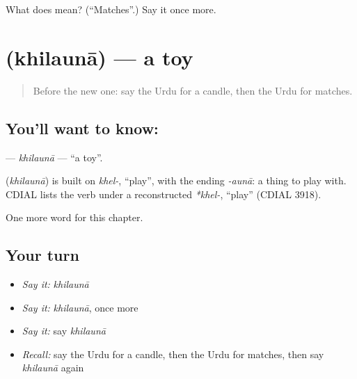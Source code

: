 \begin{tcolorbox}[breakable,colback=teal!4,colframe=teal!35!black,title={Before you move on}]
What does  mean? (\textquotedblleft{}Matches\textquotedblright{}.) Say it once more.
\end{tcolorbox}
\section[\texorpdfstring{\ur{کھلونا} (khilaunā)}{کھلونا (khilaunā)}]{ (khilaunā) — a toy}

\label{lesson:UR-C112-khilauna}



\begin{quote}
Before the new one: say the Urdu for a candle, then the Urdu for matches.
\end{quote}

\subsection*{You'll want to know: }
\textbf{} — \emph{khilaunā} — \textquotedblleft{}a toy\textquotedblright{}.

\begin{cousinweb}
\textbf{} (\emph{khilaunā}) is built on \emph{khel-}, \textquotedblleft{}play\textquotedblright{}, with the ending \emph{-aunā}: a thing to play with. CDIAL lists the verb under a reconstructed \emph{*khel-}, \textquotedblleft{}play\textquotedblright{} (CDIAL 3918).
\end{cousinweb}

\begin{grammarlens}[title={What you've built}]
One more word for this chapter.
\end{grammarlens}

\subsection*{Your turn}
\begin{itemize}
\raggedright
  \item \emph{Say it:} \emph{khilaunā}
  \item \emph{Say it:} \emph{khilaunā}, once more
  \item \emph{Say it:} say \emph{khilaunā}
  \item \emph{Recall:} say the Urdu for a candle, then the Urdu for matches, then say \emph{khilaunā} again
\end{itemize}

